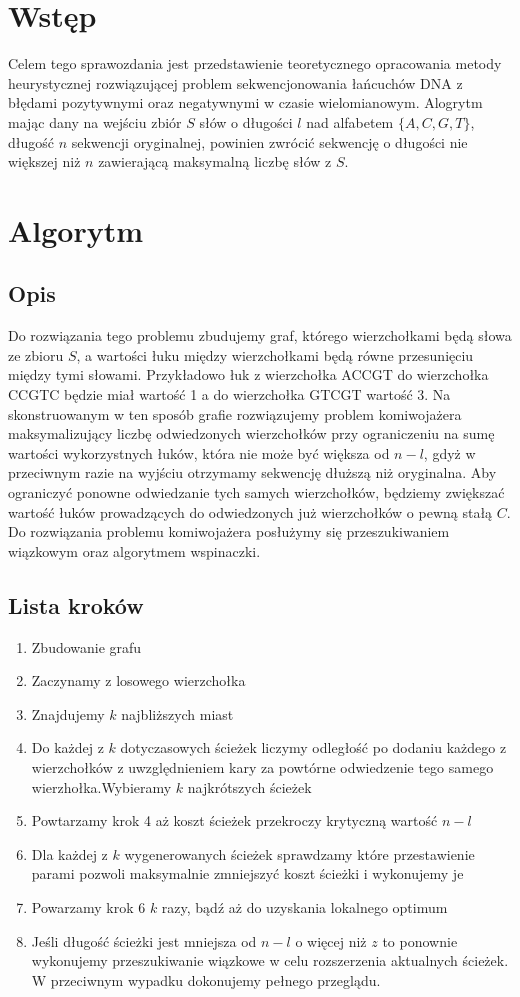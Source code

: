 \documentclass{article}
\begin{document}



\section{Wstęp}
Celem tego sprawozdania jest przedstawienie teoretycznego opracowania metody heurystycznej rozwiązującej problem sekwencjonowania łańcuchów DNA z błędami pozytywnymi oraz negatywnymi w czasie wielomianowym. Alogrytm mając dany na wejściu zbiór $S$ słów o długości $l$ nad alfabetem $\{A, C, G, T\}$, długość $n$ sekwencji oryginalnej, powinien zwrócić sekwencję o długości nie większej niż $n$ zawierającą maksymalną liczbę słów z $S$.

\section{Algorytm}
\subsection{Opis}
Do rozwiązania tego problemu zbudujemy graf, którego wierzchołkami będą słowa ze zbioru $S$, a wartości łuku między wierzchołkami będą równe przesunięciu między tymi słowami. Przykładowo łuk z wierzchołka ACCGT do wierzchołka CCGTC będzie miał wartość 1 a do wierzchołka GTCGT wartość 3. Na skonstruowanym w ten sposób grafie rozwiązujemy problem komiwojażera maksymalizujący liczbę odwiedzonych wierzchołków przy ograniczeniu na sumę wartości wykorzystnych łuków, która nie może być większa od $n - l$, gdyż w przeciwnym razie na wyjściu otrzymamy sekwencję dłuższą niż oryginalna.
Aby ograniczyć ponowne odwiedzanie tych samych wierzchołków, będziemy zwiększać wartość łuków prowadzących do odwiedzonych już wierzchołków o pewną stałą $C$.
Do rozwiązania problemu komiwojażera posłużymy się przeszukiwaniem wiązkowym oraz algorytmem wspinaczki.
\subsection{Lista kroków}
\begin{enumerate}
    \item Zbudowanie grafu
    \item Zaczynamy z losowego wierzchołka
    \item Znajdujemy $k$ najbliższych miast
    \item Do każdej z $k$ dotyczasowych ścieżek liczymy odległość po dodaniu każdego z wierzchołków z uwzględnieniem kary za powtórne odwiedzenie tego samego wierzhołka.Wybieramy $k$ najkrótszych ścieżek
    \item Powtarzamy krok 4 aż koszt ścieżek przekroczy krytyczną wartość $n-l$
    \item Dla każdej z $k$ wygenerowanych ścieżek sprawdzamy które przestawienie parami pozwoli maksymalnie zmniejszyć koszt ścieżki i wykonujemy je
    \item Powarzamy krok 6 $k$ razy, bądź aż do uzyskania lokalnego optimum
    \item Jeśli długość ścieżki jest mniejsza od $n-l$ o więcej niż $z$ to ponownie wykonujemy przeszukiwanie wiązkowe w celu rozszerzenia aktualnych ścieżek. W przeciwnym wypadku dokonujemy pełnego przeglądu.
\end{enumerate}
\end{document}
